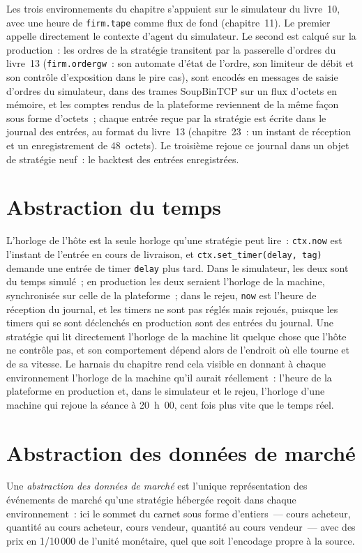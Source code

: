 Les trois environnements du chapitre s'appuient sur le simulateur du livre~10, avec une heure de \texttt{firm.tape} comme flux de fond (chapitre~11). Le
premier appelle directement le contexte d'agent du simulateur. Le second est calqué sur la production~: les ordres de la stratégie transitent par la
passerelle d'ordres du livre~13 (\texttt{firm.ordergw}~: son automate d'état de l'ordre, son limiteur de débit et son contrôle d'exposition dans le pire cas), sont encodés en
messages de saisie d'ordres du simulateur, dans des trames SoupBinTCP sur un flux d'octets en mémoire, et les comptes rendus de la plateforme reviennent de la même façon sous forme d'octets~;
chaque entrée reçue par la stratégie est écrite dans le journal des entrées, au format du livre~13 (chapitre~23~: un instant de réception et un enregistrement de 48~octets). Le
troisième rejoue ce journal dans un objet de stratégie neuf~: le backtest des entrées enregistrées.

\section{Abstraction du temps}

L'horloge de l'hôte est la seule horloge qu'une stratégie peut lire~: \texttt{ctx.now} est l'instant de l'entrée en cours de livraison, et
\texttt{ctx.set\_timer(delay, tag)} demande une entrée de timer \texttt{delay} plus tard. Dans le simulateur, les deux sont du temps simulé~; en production
les deux seraient l'horloge de la machine, synchronisée sur celle de la plateforme~; dans le rejeu, \texttt{now} est l'heure de réception du journal, et les timers ne sont pas réglés
mais rejoués, puisque les timers qui se sont déclenchés en production sont des entrées du journal. Une stratégie qui lit directement l'horloge de la machine lit
quelque chose que l'hôte ne contrôle pas, et son comportement dépend alors de l'endroit où elle tourne et de sa vitesse. Le harnais du chapitre rend cela
visible en donnant à chaque environnement l'horloge de la machine qu'il aurait réellement~: l'heure de la plateforme en production et, dans le simulateur et le
rejeu, l'horloge d'une machine qui rejoue la séance à 20~h~00, cent fois plus vite que le temps réel.

\section{Abstraction des données de marché}

\begin{definition}\label{def:pl:simulation-production-parity:md}
Une \emph{abstraction des données de marché} est l'unique représentation des événements de marché
qu'une stratégie hébergée reçoit dans chaque environnement~: ici le sommet du carnet sous forme d'entiers~--- cours acheteur, quantité au cours acheteur, cours vendeur, quantité au cours vendeur~--- avec des prix en 1/10\,000 de l'unité
monétaire, quel que soit l'encodage propre à la source.
\end{definition}

